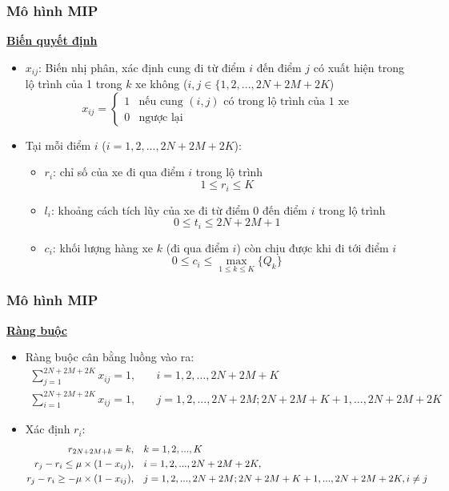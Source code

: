 \documentclass{beamer}
\begin{document}
	\begin{frame}
		\frametitle{Mô hình MIP}
	\textbf{\underline{Biến quyết định}}
	\begin{itemize}
		\item $x_{ij}$: Biến nhị phân, xác định cung đi từ điểm $i$ đến điểm $j$ có xuất hiện trong lộ trình của 1 trong $k$ xe không ($i,j\in \{1,2,...,2N+2M+2K$)
		\begin{equation}
		x_{ij} = 
		\begin{cases}
		1 & \text{nếu cung $(i,j)$ có trong lộ trình của 1 xe}\\
		0 & \text{ngược lại}
		\end{cases}
		\end{equation}
		\item Tại mỗi điểm $i$ ($i=1,2,...,2N+2M+2K$):
		\begin{itemize}
			\item $r_i$: chỉ số của xe đi qua điểm $i$ trong lộ trình
			\begin{equation}
			1\leq r_i\leq K
			\end{equation}
			\item $l_i$: khoảng cách tích lũy của xe đi từ điểm $0$ đến điểm $i$ trong lộ trình
			\begin{equation}
			0\leq t_i\leq 2N+2M+1
			\end{equation}
			\item $c_i$: khối lượng hàng xe $k$ (đi qua điểm $i$) còn chịu được khi đi tới điểm $i$
			\begin{equation}
			0\leq c_i\leq \max _{1\leq k\leq K} \{Q_k\}
			\end{equation}
		\end{itemize}
	\end{itemize}
		
	\end{frame}
	\begin{frame}
		\frametitle{Mô hình MIP}
		\textbf{\underline{Ràng buộc}}
		\begin{itemize}
			\item Ràng buộc cân bằng luồng vào ra:
			\begin{align}
					\sum_{j=1}^{2N+2M+2K} x_{ij} = 1,\quad & i=1,2,...,2N+2M+K \\
				\sum_{i=1}^{2N+2M+2K} x_{ij} = 1,\quad & j=1,2,...,2N+2M;2N+2M+K+1,...,2N+2M+2K
			\end{align}
			\item Xác định $r_i$:
			\begin{align}
				r_{2N+2M+k} = k,\quad & k=1,2,...,K \\
				r_j - r_i\leq \mu\times (1 - x_{ij}),\quad & i=1,2,...,2N+2M+2K, \\
				r_j - r_i\geq -\mu\times (1 -x_{ij}),\quad & j=1,2,...,2N+2M;2N+2M+K+1,...,2N+2M+2K, i\ne j \notag
			\end{align}
		\end{itemize}
	\end{frame}
\end{document}
